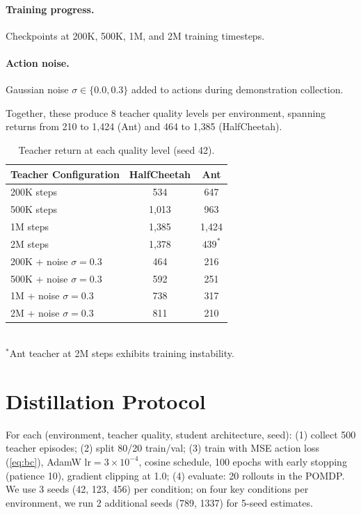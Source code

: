 \paragraph{Training progress.} Checkpoints at 200K, 500K, 1M, and 2M training timesteps.
\paragraph{Action noise.} Gaussian noise $\sigma \in \{0.0, 0.3\}$ added to actions during demonstration collection.

Together, these produce 8 teacher quality levels per environment, spanning returns from 210 to 1{,}424 (Ant) and 464 to 1{,}385 (HalfCheetah).

\begin{table}[ht]
\centering
\caption{Teacher return at each quality level (seed 42).}
\label{tab:teacher-quality}
\begin{tabular}{lcc}
\toprule
Teacher Configuration & HalfCheetah & Ant \\
\midrule
200K steps            & 534 & 647 \\
500K steps            & 1{,}013 & 963 \\
1M steps              & 1{,}385 & 1{,}424 \\
2M steps              & 1{,}378 & $439^*$ \\
\midrule
200K + noise $\sigma{=}0.3$ & 464 & 216 \\
500K + noise $\sigma{=}0.3$ & 592 & 251 \\
1M + noise $\sigma{=}0.3$   & 738 & 317 \\
2M + noise $\sigma{=}0.3$   & 811 & 210 \\
\bottomrule
\end{tabular}
\\[4pt]
{\small $^*$Ant teacher at 2M steps exhibits training instability.}
\end{table}

\section{Distillation Protocol}
\label{sec:distill-protocol}

For each (environment, teacher quality, student architecture, seed):
(1) collect 500 teacher episodes;
(2) split 80/20 train/val;
(3) train with MSE action loss (\cref{eq:bc}), AdamW lr${=}3{\times}10^{-4}$, cosine schedule, 100 epochs with early stopping (patience 10), gradient clipping at 1.0;
(4) evaluate: 20 rollouts in the POMDP.
We use 3 seeds (42, 123, 456) per condition; on four key conditions per environment, we run 2 additional seeds (789, 1337) for 5-seed estimates.

